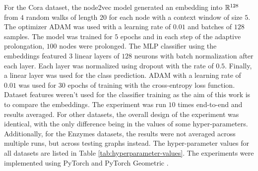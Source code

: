 For the Cora dataset, the node2vec model generated an embedding into \( \mathbb{R}^{128} \) from \( 4 \) random walks of length \( 20 \) for each node with a context window of size \( 5 \). The optimizer ADAM \cite{kingma_adam:_2017} was used with a learning rate of \( 0.01 \) and batches of \( 128 \) samples. The model was trained for \( 5 \) epochs and in each step of the adaptive prolongation, \( 100 \) nodes were prolonged. The MLP classifier using the embeddings featured \( 3 \) linear layers of \( 128 \) neurons with batch normalization after each layer. Each layer was normalized using dropout \cite{srivastava_dropout_2014} with the rate of \( 0.5 \). Finally, a linear layer was used for the class prediction. ADAM with a learning rate of \( 0.01 \)  was used for \( 30 \) epochs of training with the cross-entropy loss function. Dataset features weren't used for the classifier training as the aim of this work is to compare the embeddings. The experiment was run \( 10 \) times end-to-end and results averaged. For other datasets, the overall design of the experiment was identical, with the only difference being in the values of some hyper-parameters. Additionally, for the Enzymes datasets, the results were not averaged across multiple runs, but across testing graphs instead. The hyper-parameter values for all datasets are listed in Table \ref{tab:hyperparameter-values}. The experiments were implemented using PyTorch \cite{paszke_pytorch_2019} and PyTorch Geometric \cite{fey_fast_2019}.

